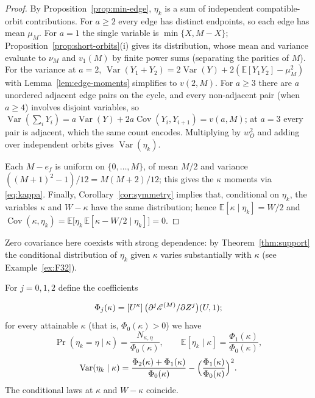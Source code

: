 \begin{proof}
By Proposition~\ref{prop:min-edge}, $\eta_k$ is a sum of independent
compatible-orbit contributions.  For $a\geq2$ every edge has distinct
endpoints, so each edge has mean $\mu_M$.  For $a=1$ the single variable is
$\min\{X,M-X\}$; Proposition~\ref{prop:short-orbits}(i) gives its distribution,
whose mean and variance evaluate to $\nu_M$ and $v_1(M)$ by finite power sums
(separating the parities of $M$).  For the variance at $a=2$,
$\operatorname{Var}(Y_1+Y_2)=2\operatorname{Var}(Y)
 +2(\mathbb{E}[Y_1Y_2]-\mu_M^2)$ with
Lemma~\ref{lem:edge-moments} simplifies to $v(2,M)$.  For $a\geq3$ there are
$a$ unordered adjacent edge pairs on the cycle, and every non-adjacent pair
(when $a\geq4$) involves disjoint variables, so
$\operatorname{Var}(\sum_iY_i)=a\operatorname{Var}(Y)
 +2a\operatorname{Cov}(Y_i,Y_{i+1})=v(a,M)$; at $a=3$ every pair is adjacent,
which the same count encodes.  Multiplying by $w_O^2$ and adding over
independent orbits gives $\operatorname{Var}(\eta_k)$.

Each $M-e_f$ is uniform on $\{0,\ldots,M\}$, of mean $M/2$ and variance
$((M+1)^2-1)/12=M(M+2)/12$; this gives the $\kappa$ moments via
\eqref{eq:kappa}.  Finally, Corollary~\ref{cor:symmetry} implies that,
conditional on $\eta_k$, the variables $\kappa$ and $W-\kappa$ have the same
distribution; hence $\mathbb{E}[\kappa\mid\eta_k]=W/2$ and
$\operatorname{Cov}(\kappa,\eta_k)
 =\mathbb{E}\bigl[\eta_k\,\mathbb{E}[\kappa-W/2\mid\eta_k]\bigr]=0$.
\end{proof}

Zero covariance here coexists with strong dependence: by
Theorem~\ref{thm:support} the conditional distribution of $\eta_k$ given
$\kappa$ varies substantially with $\kappa$ (see Example~\ref{ex:F32}).

\begin{proposition}\label{prop:conditional}
For $j=0,1,2$ define the coefficients

\[
\Phi_j(\kappa)=[U^\kappa]\,\bigl(\partial^j\mathscr E^{(M)}/\partial Z^j\bigr)(U,1);
\]
for every attainable $\kappa$ (that is, $\Phi_0(\kappa)>0$) we have
\[
\Pr(\eta_k=\eta\mid\kappa)=\frac{N_{\kappa,\eta}}{\Phi_0(\kappa)},\qquad
\mathbb{E}[\eta_k\mid\kappa]=\frac{\Phi_1(\kappa)}{\Phi_0(\kappa)},
\]
\[
\operatorname{Var}(\eta_k\mid\kappa)
 =\frac{\Phi_2(\kappa)+\Phi_1(\kappa)}{\Phi_0(\kappa)}
  -\Bigl(\frac{\Phi_1(\kappa)}{\Phi_0(\kappa)}\Bigr)^2.
\]
The conditional laws at $\kappa$ and $W-\kappa$ coincide.
\end{proposition}

